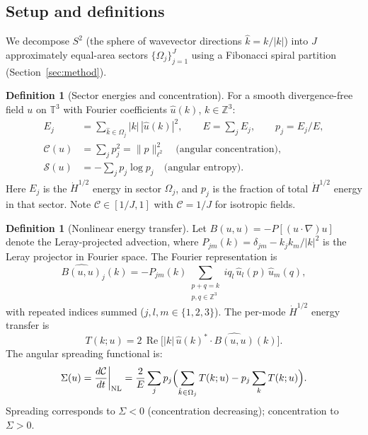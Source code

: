 \documentclass[11pt]{article}
\theoremstyle{definition}
\newtheorem{definition}[theorem]{Definition}
\newcommand{\T}{\mathbb{T}}
\newcommand{\Z}{\mathbb{Z}}
\newcommand{\Hdot}[1]{\dot{H}^{#1}}
\newcommand{\cS}{\mathcal{S}}
\newcommand{\cC}{\mathcal{C}}
\DeclareMathOperator{\re}{Re}
\begin{document}
\subsection{Setup and definitions}

We decompose $S^2$ (the sphere of wavevector directions
$\hat k = k/|k|$) into $J$ approximately equal-area
sectors $\{\Omega_j\}_{j=1}^J$ using a Fibonacci spiral
partition (Section~\ref{sec:method}).

\begin{definition}[Sector energies and concentration]
\label{def:sector}
For a smooth divergence-free field $u$ on $\T^3$
with Fourier coefficients $\hat u(k)$, $k\in\Z^3$:
\begin{align}
E_j &= \sum_{\hat k\in\Omega_j}|k|\,|\hat u(k)|^2,
\qquad E = \sum_j E_j, \qquad p_j = E_j/E,\\
\cC(u) &= \sum_j p_j^2 = \|p\|_{\ell^2}^2
\quad\text{(angular concentration)},\\
\cS(u) &= -\sum_j p_j\log p_j
\quad\text{(angular entropy)}.
\end{align}
Here $E_j$ is the $\Hdot{1/2}$ energy in sector
$\Omega_j$, and $p_j$ is the fraction of total
$\Hdot{1/2}$ energy in that sector.  Note $\cC\in[1/J,1]$
with $\cC=1/J$ for isotropic fields.
\end{definition}

\begin{definition}[Nonlinear energy transfer]
\label{def:transfer}
Let $B(u,u) = -P[(u\cdot\nabla)u]$ denote the
Leray-projected advection, where
$P_{jm}(k) = \delta_{jm}-k_jk_m/|k|^2$ is the Leray
projector in Fourier space.  The Fourier representation is
\begin{equation}\label{eq:B-fourier}
\widehat{B(u,u)}_j(k)
= -P_{jm}(k)\sum_{\substack{p+q=k\\p,q\in\Z^3}}
iq_l\,\hat u_l(p)\,\hat u_m(q),
\end{equation}
with repeated indices summed ($j,l,m\in\{1,2,3\}$).
The per-mode $\Hdot{1/2}$ energy transfer is
\begin{equation}\label{eq:Tk}
T(k;u) = 2\,\re\bigl[|k|\,\hat u(k)^*
\cdot\widehat{B(u,u)}(k)\bigr].
\end{equation}
The angular spreading functional is:
\begin{equation}\label{eq:Sigma}
\Sigma(u) = \frac{d\cC}{dt}\bigg|_{\rm NL}
= \frac{2}{E}\sum_j p_j\Bigl(\sum_{\hat k\in\Omega_j}T(k;u)
- p_j\sum_k T(k;u)\Bigr).
\end{equation}
Spreading corresponds to $\Sigma < 0$ (concentration
decreasing); concentration to $\Sigma > 0$.
\end{definition}
\end{document}
